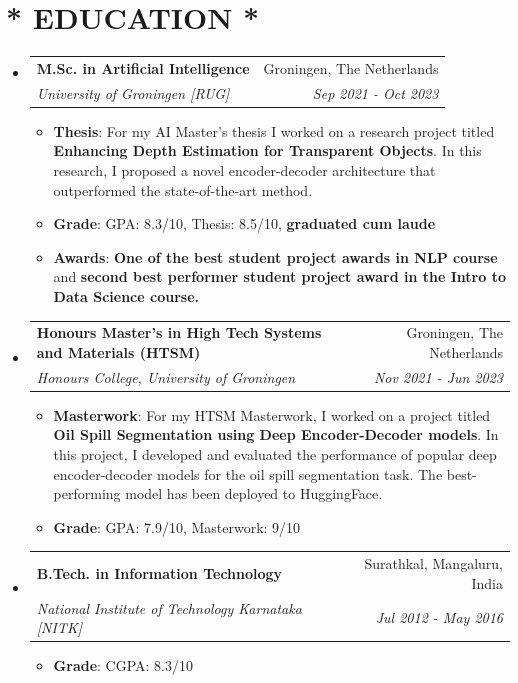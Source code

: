 \documentclass[letterpaper, 11pt]{article}
\makeatletter
\newcommand{\resumeItem}[2]{
    \item\small{
        \textbf{#1}{: #2 \vspace{-2pt}}
    }
}
\newcommand{\resumeSubheading}[4]{
    \vspace{-1pt}\item
    \begin{tabular*}{0.97\textwidth}{l@{\extracolsep{\fill}}r}
        \textbf{#1} & #2 \\
        \textit{\small#3} & \textit{\small #4} \\
    \end{tabular*}\vspace{-5pt}
}
\newcommand{\resumeSubHeadingListStart}{\begin{itemize}[leftmargin=*]}
\newcommand{\resumeSubHeadingListEnd}{\end{itemize}\vspace{-5pt}}
\makeatother
\begin{document}
\section{\textbf{\textcolor{navy_blue}{* EDUCATION *}}}
    \resumeSubHeadingListStart
        \resumeSubheading
            {M.Sc. in Artificial Intelligence}{Groningen, The Netherlands}
            {University of Groningen [RUG]}{Sep 2021 - Oct 2023}
            \resumeSubHeadingListStart
                \resumeItem{Thesis}{For my AI Master's thesis I worked on a research project titled \textbf{Enhancing Depth Estimation for Transparent Objects}. In this research, I proposed a novel encoder-decoder architecture that outperformed the state-of-the-art method.}
                \resumeItem{Grade}{GPA: 8.3/10, Thesis: 8.5/10, \textbf{graduated cum laude}}
                \resumeItem{Awards}{\textbf{One of the best student project awards in NLP course} and \textbf{second best performer student project award in the Intro to Data Science course.}}
            \resumeSubHeadingListEnd

        \resumeSubheading
            {Honours Master's in High Tech Systems and Materials (HTSM)}{Groningen, The Netherlands}
            {Honours College, University of Groningen}{Nov 2021 - Jun 2023}
            \resumeSubHeadingListStart
                \resumeItem{Masterwork}{For my HTSM Masterwork, I worked on a project titled \textbf{Oil Spill Segmentation using Deep Encoder-Decoder models}. In this project, I developed and evaluated the performance of popular deep encoder-decoder models for the oil spill segmentation task. The best-performing model has been deployed to HuggingFace.}
                \resumeItem{Grade}{GPA: 7.9/10, Masterwork: 9/10}
            \resumeSubHeadingListEnd
        
        \resumeSubheading
            {B.Tech. in Information Technology}{Surathkal, Mangaluru,  India}
            {National Institute of Technology Karnataka [NITK]}{Jul 2012 - May 2016}
            \resumeSubHeadingListStart
                \resumeItem{Grade}{CGPA: 8.3/10}
            \resumeSubHeadingListEnd
    \resumeSubHeadingListEnd
\end{document}
